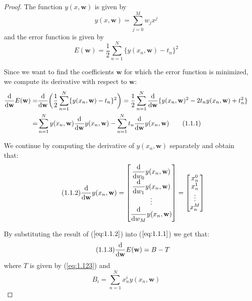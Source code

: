 \begin{proof}
    The function $y(x, \mathbf{w})$ is given by
    \begin{equation*}\label{eq:1.1}\tag{1.1}
        y(x, \mathbf{w}) = \sum_{j = 0}^M w_j x^j
    \end{equation*}
    and the error function is given by
    \begin{equation*}\label{eq:1.2}\tag{1.2}
        E(\mathbf{w}) = \frac{1}{2} \sum_{n = 1}^N \{y(x_n, \mathbf{w}) - t_n\}^2
    \end{equation*}

    Since we want to find the coefficients $\mathbf{w}$ for which
    the error function is minimized, we compute its derivative with
    respect to $\mathbf{w}$:
    \begin{align*}
        \dv{\mathbf{w}} E(\mathbf{w}) 
        =& \dv{\mathbf{w}} \bigg(\frac{1}{2} \sum_{n = 1}^N \{y(x_n, \mathbf{w}) - t_n\}^2\bigg)
        = \frac{1}{2} \sum_{n = 1}^{N} \dv{\mathbf{w}} \{y(x_n, \mathbf{w})^2 - 2t_ny(x_n, \mathbf{w}) + t_n^2\} \\
        =& \sum_{n = 1}^N y(x_n, \mathbf{w}) \dv{\mathbf{w}} y(x_n, \mathbf{w})
            - \sum_{n = 1}^N t_n \dv{\mathbf{w}} y(x_n, \mathbf{w}) \label{eq:1.1.1}\tag{1.1.1}
    \end{align*}

    We continue by computing the derivative of $y(x_n, \mathbf{w})$ separately and obtain that:
    \begin{equation}\label{eq:1.1.2}\tag{1.1.2}
        \dv{\mathbf{w}} y(x_n, \mathbf{w}) 
        = \begin{bmatrix} 
            \displaystyle \dv{w_0} y(x_n, \mathbf{w}) \\
            \displaystyle \dv{w_1} y(x_n, \mathbf{w}) \\
            \vdots \\
            \displaystyle \dv{w_M} y(x_n, \mathbf{w}) \\
        \end{bmatrix}
        = \begin{bmatrix}
            x_n^0 \\
            x_n^1 \\
            \vdots \\
            x_n^M
        \end{bmatrix}
    \end{equation}

    By substituting the result of ($\ref{eq:1.1.2}$) into ($\ref{eq:1.1.1}$) we get that:
    \begin{equation}\label{eq:1.1.3}\tag{1.1.3}
        \dv{\mathbf{w}} E(\mathbf{w}) = B - T
    \end{equation}
    where $T$ is given by (\ref{eq:1.123}) and
    \[
        B_i = \sum_{n = 1}^{N} x_n^i y(x_n, \mathbf{w})  
    \] 


\end{proof}
